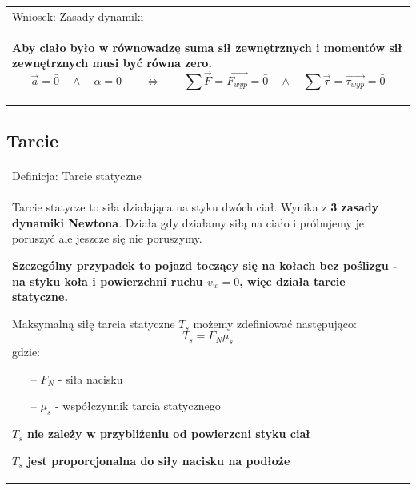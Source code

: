 \documentclass[a4paper]{article}
\newenvironment{definition}[2][Definicja]
    {
        \begin{center}
        \begin{tabular}{|p{1\textwidth}|}
        \hline
            #1: #2\\[2ex]
        \begin{em}
        \Large
    }
    { 
        \end{em}
        \\\hline
        \end{tabular} 
        \end{center}
    }
\begin{document}
    \begin{definition}[Wniosek]{Zasady dynamiki}
        \textbf{Aby ciało było w równowadzę suma sił zewnętrznych i momentów sił zewnętrznych
        musi być równa zero.}
        \[\vec{a} = \bar{0} \quad\land\quad \alpha = 0 \qquad\iff\qquad 
        \sum \vec{F} = \vec{F_{wyp}} = \bar{0}
        \quad\land\quad \sum \vec{\tau} = \vec{\tau_{wyp}} = \bar{0} \]
    \end{definition}

    \subsection{\LARGE Tarcie}
    \Large
    \begin{definition}{Tarcie statyczne}
        Tarcie statycze to siła działająca na styku dwóch ciał. Wynika z \textbf{3 zasady dynamiki
        Newtona}. Działa gdy działamy siłą na ciało i próbujemy je poruszyć ale jeszcze się nie poruszymy.
        
        \textbf{Szczególny przypadek to pojazd toczący się na kołach bez poślizgu - na styku koła i powierzchni ruchu $v_w = 0$, więc działa tarcie
        statyczne.} 

        Maksymalną siłę tarcia statyczne $T_s$ możemy zdefiniować następująco:
        \[T_s = F_N{\mu_s}\]
        gdzie:
        \begin{itemize}
            \item[--] $F_N$ - siła nacisku
            \item[--] $\mu_s$ - współczynnik tarcia statycznego
        \end{itemize}

        \textbf{$T_s$ nie zależy w przybliżeniu od powierzcni styku ciał}

        \textbf{$T_s$ jest proporcjonalna do siły nacisku na podłoże}
    \end{definition}
\end{document}
